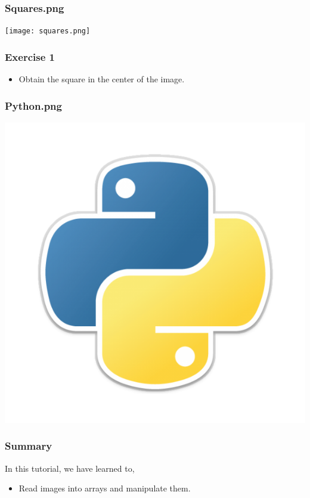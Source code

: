 \documentclass[17pt]{beamer}
\begin{document}
\begin{frame}
\frametitle{Squares.png}
\label{sec-7}

    \begin{center}
      \texttt{[image: squares.png]}    
    \end{center}
\end{frame}

\begin{frame}[fragile]
\frametitle{Exercise 1}
\label{sec-11}
\begin{itemize}
\item Obtain the square in the center of the image. 
\end{itemize}
\end{frame}
\begin{frame}
\frametitle{Python.png}
\label{sec-7}

    \begin{center}
      \includegraphics[scale=0.35]{Python.png}    
    \end{center}
\end{frame}
\begin{frame}
\frametitle{Summary}
\label{sec-13}

  In this tutorial, we have learned to, \pause

\begin{itemize}
\item Read images into arrays and manipulate them.
\end{itemize}
\end{frame}
\end{document}
